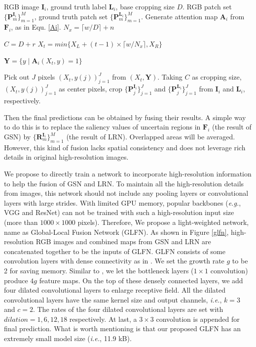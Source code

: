 \begin{algorithm}[t]
\caption{Attended Patch Sampling.}
\begin{algorithmic}[1]
\label{alg:crop}
\REQUIRE RGB image $\bm{I}_i$, ground truth label $\bm{L}_i$, base cropping size $D$.
\ENSURE RGB patch set $\{\bm{P}_m^{\bm{I}_i}\}_{m=1}^M$, ground truth patch set $\{\bm{P}_m^{\bm{L}_i}\}_{m=1}^M$.
\STATE Generate attention map $\bm{A}_i$ from $\bm{F}_i$, as in Equ. \ref{Ai}.
\STATE $N_x=\lceil w/D\rceil+n$

\STATE $C = D + r$
\STATE $X_t=min\{X_L+(t-1)\times \lceil w/N_x\rceil, X_R\}$

\STATE $\bm{Y} = \{y\mid \bm{A}_i (X_t, y) = 1\}$

\STATE Pick out $J$ pixels $(X_t,y(j))_{j=1}^J$ from $(X_t,\bm{Y})$.
\STATE Taking $C$ as cropping size, $(X_t,y(j))_{j=1}^J$ as center pixels, crop $\{\bm{P}_j^{\bm{I}_i}\}_{j=1}^J$ and $\{\bm{P}_j^{\bm{L}_i}\}_{j=1}^J$ from $\bm{I}_i$ and $\bm{L}_i$, respectively.
\ENDFOR
\end{algorithmic}
\end{algorithm}

Then the final predictions can be obtained by fusing their results. A simple way to do this is to replace the saliency values of uncertain regions in $\bm{F}_i$ (the result of GSN) by $\{\bm{R}_m^{\bm{I}_i}\}_{m=1}^M$ (the result of LRN). Overlapped areas will be averaged. However, this kind of fusion lacks spatial consistency and does not leverage rich details in original high-resolution images.   

We propose to directly train a network to incorporate high-resolution information to help the fusion of GSN and LRN. To maintain all the high-resolution details from images, this network should not include any pooling layers or convolutional layers with large strides. With limited GPU memory, popular backbones (\emph{e.g.}, VGG and ResNet) can not be trained with such a high-resolution input size (more than $1000\times1000$ pixels). Therefore, We propose a light-weighted network, name as Global-Local Fusion Network (GLFN). As shown in Figure \ref{glfn}, high-resolution RGB images and combined maps from GSN and LRN are concatenated together to be the inputs of GLFN. GLFN consists of some convolution layers with dense connectivity as in \cite{huang2017densely}. We set the growth rate $g$ to be 2 for saving memory. Similar to \cite{huang2017densely}, we let the bottleneck layers ($1\times1$ convolution) produce $4g$ feature maps. On the top of these densely connected layers, we add four dilated convolutional layers to enlarge receptive field. All the dilated convolutional layers have the same kernel size and output channels, \emph{i.e.}, $k=3$ and $c=2$. The rates of the four dilated convolutional layers are set with $dilation=1, 6, 12, 18$ respectively. At last, a $3\times3$ convolution is appended for final prediction. What is worth mentioning is that our proposed GLFN has an extremely small model size (\emph{i.e.}, 11.9 kB). 


